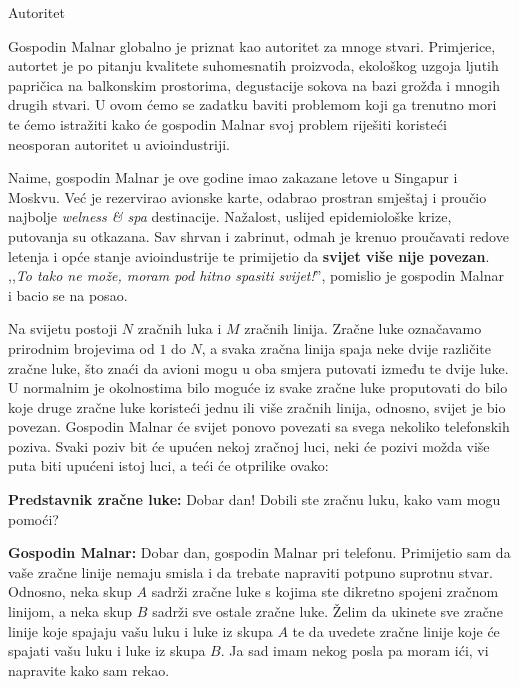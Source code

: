 \begin{statement}[
  problempoints=100,
  timelimit=1 sekunda,
  memorylimit=512 MiB,
]{Autoritet}

Gospodin Malnar globalno je priznat kao autoritet za mnoge stvari. Primjerice,
autortet je po pitanju kvalitete suhomesnatih proizvoda, ekološkog uzgoja
ljutih papričica na balkonskim prostorima, degustacije sokova na bazi grožđa
i mnogih drugih stvari.  U ovom ćemo se zadatku baviti problemom koji ga
trenutno mori te ćemo istražiti kako će gospodin Malnar svoj problem riješiti
koristeći neosporan autoritet u avioindustriji.

Naime, gospodin Malnar je ove godine imao zakazane letove u Singapur i Moskvu.
Već je rezervirao avionske karte, odabrao prostran smještaj i proučio
najbolje \textit{welness \& spa} destinacije. Nažalost, uslijed epidemiološke
krize, putovanja su otkazana. Sav shrvan i zabrinut, odmah je krenuo
proučavati redove letenja i opće stanje avioindustrije te primijetio da
\textbf{svijet više nije povezan}. ,,\textit{To tako ne može, moram pod hitno
spasiti svijet!}'', pomislio je gospodin Malnar i bacio se na posao.

Na svijetu postoji $N$ zračnih luka i $M$ zračnih linija. Zračne luke
označavamo prirodnim brojevima od $1$ do $N$, a svaka zračna linija spaja
neke dvije različite zračne luke, što znaći da avioni mogu u oba smjera
putovati između te dvije luke. U normalnim je okolnostima bilo moguće iz
svake zračne luke proputovati do bilo koje druge zračne luke koristeći jednu
ili više zračnih linija, odnosno, svijet je bio povezan. Gospodin Malnar će
svijet ponovo povezati sa svega nekoliko telefonskih poziva. Svaki poziv bit
će upućen nekoj zračnoj luci, neki će pozivi možda više puta biti upućeni
istoj luci, a teći će otprilike ovako:

\textbf{Predstavnik zračne luke:} Dobar dan! Dobili ste zračnu luku, kako vam
mogu pomoći?

\textbf{Gospodin Malnar:} Dobar dan, gospodin Malnar pri telefonu. Primijetio
sam da vaše zračne linije nemaju smisla i da trebate napraviti potpuno
suprotnu stvar. Odnosno, neka skup $A$ sadrži zračne luke s kojima ste
dikretno spojeni zračnom linijom, a neka skup $B$ sadrži sve ostale zračne
luke. Želim da ukinete sve zračne linije koje spajaju vašu luku i luke iz
skupa $A$ te da uvedete zračne linije koje će spajati vašu luku i luke iz
skupa $B$. Ja sad imam nekog posla pa moram ići, vi napravite kako sam rekao.


\end{statement}
